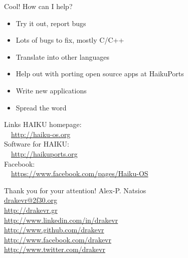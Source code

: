 \documentclass{beamer}
\begin{document}
    \begin{frame}{Cool! How can I help?}
        \begin{itemize}
            \item Try it out, report bugs
            \item Lots of bugs to fix, mostly C/C++
            \item Translate into other languages
            \item Help out with porting open source apps at HaikuPorts
            \item Write new applications
            \item Spread the word
        \end{itemize}
    \end{frame}

    \begin{frame}{Links}
        HAIKU homepage:\\
        \ \ \url{http://haiku-os.org}\\
        Software for HAIKU:\\
        \ \ \url{http://haikuports.org}\\
        Facebook:\\
        \ \ \url{https://www.facebook.com/pages/Haiku-OS}\\
    \end{frame}

    \begin{frame}{Thank you for your attention!}
        \center Alex-P. Natsios\\
        \center\url{drakevr@2f30.org}\\
        \center\url{http://drakevr.gr}\\
        \center\url{http://www.linkedin.com/in/drakevr}\\
        \center\url{http://www.github.com/drakevr}\\
        \center\url{http://www.facebook.com/drakevr}\\
        \center\url{http://www.twitter.com/drakevr}
    \end{frame}
\end{document}
